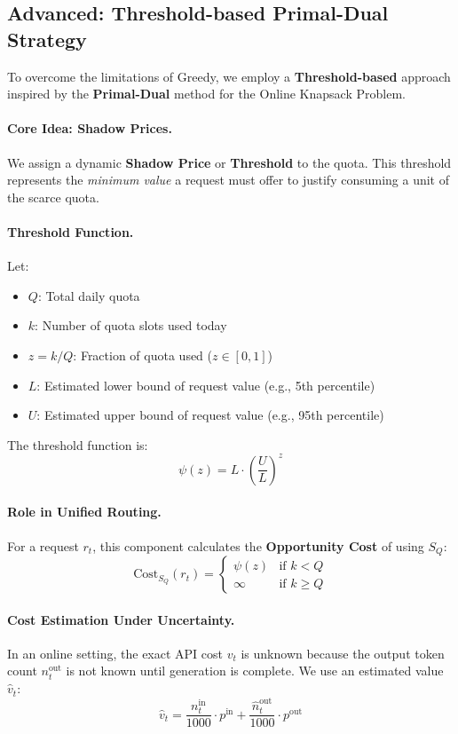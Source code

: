 \documentclass[11pt]{article}
\begin{document}
\subsection{Advanced: Threshold-based Primal-Dual Strategy}

To overcome the limitations of Greedy, we employ a \textbf{Threshold-based} approach inspired by the \textbf{Primal-Dual} method for the Online Knapsack Problem.

\paragraph{Core Idea: Shadow Prices.}
We assign a dynamic \textbf{Shadow Price} or \textbf{Threshold} to the quota. This threshold represents the \emph{minimum value} a request must offer to justify consuming a unit of the scarce quota.

\paragraph{Threshold Function.}
Let:
\begin{itemize}
  \item $Q$: Total daily quota
  \item $k$: Number of quota slots used today
  \item $z = k/Q$: Fraction of quota used ($z \in [0, 1]$)
  \item $L$: Estimated lower bound of request value (e.g., 5th percentile)
  \item $U$: Estimated upper bound of request value (e.g., 95th percentile)
\end{itemize}

The threshold function is:
\[ \psi(z) = L \cdot \left( \frac{U}{L} \right)^z \]

\paragraph{Role in Unified Routing.}
For a request $r_t$, this component calculates the \textbf{Opportunity Cost} of using $S_Q$:
\[ \text{Cost}_{S_Q}(r_t) = \begin{cases} \psi(z) & \text{if } k < Q \\ \infty & \text{if } k \ge Q \end{cases} \]

\paragraph{Cost Estimation Under Uncertainty.}
In an online setting, the exact API cost $v_t$ is unknown because the output token count $n_t^{\text{out}}$ is not known until generation is complete. We use an estimated value $\hat{v}_t$:
\[ \hat{v}_t = \frac{n_t^{\text{in}}}{1000} \cdot p^{\text{in}} + \frac{\hat{n}_t^{\text{out}}}{1000} \cdot p^{\text{out}} \]
\end{document}
